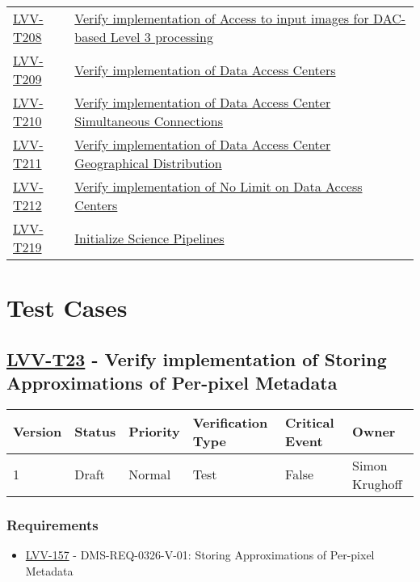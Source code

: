 \begin{longtable}[]{p{3cm}p{13cm}}
    \hyperref[lvv-t208]{LVV-T208} &
    \href{https://jira.lsstcorp.org/secure/Tests.jspa\#/testCase/LVV-T208}{Verify implementation of Access to input images for DAC-based Level 3 processing} \tabularnewline
    \hyperref[lvv-t209]{LVV-T209} &
    \href{https://jira.lsstcorp.org/secure/Tests.jspa\#/testCase/LVV-T209}{Verify implementation of Data Access Centers} \tabularnewline
    \hyperref[lvv-t210]{LVV-T210} &
    \href{https://jira.lsstcorp.org/secure/Tests.jspa\#/testCase/LVV-T210}{Verify implementation of  Data Access Center Simultaneous Connections} \tabularnewline
    \hyperref[lvv-t211]{LVV-T211} &
    \href{https://jira.lsstcorp.org/secure/Tests.jspa\#/testCase/LVV-T211}{Verify implementation of Data Access Center Geographical Distribution} \tabularnewline
    \hyperref[lvv-t212]{LVV-T212} &
    \href{https://jira.lsstcorp.org/secure/Tests.jspa\#/testCase/LVV-T212}{Verify implementation of No Limit on Data Access Centers} \tabularnewline
    \hyperref[lvv-t219]{LVV-T219} &
    \href{https://jira.lsstcorp.org/secure/Tests.jspa\#/testCase/LVV-T219}{Initialize Science Pipelines} \tabularnewline
\bottomrule
\end{longtable}

\newpage

\section{Test Cases}

\subsection{\href{https://jira.lsstcorp.org/secure/Tests.jspa\#/testCase/LVV-T23}{LVV-T23}
    - Verify implementation of Storing Approximations of Per-pixel Metadata}\label{lvv-t23}

\begin{longtable}[]{llllll}
\toprule
Version & Status & Priority & Verification Type & Critical Event & Owner
\\\midrule
1 & Draft & Normal &
Test & False & Simon Krughoff
\\\bottomrule
\end{longtable}

\subsubsection{Requirements}
\begin{itemize}
\item \href{https://jira.lsstcorp.org/browse/LVV-157}{LVV-157} - DMS-REQ-0326-V-01: Storing Approximations of Per-pixel Metadata
\end{itemize}

